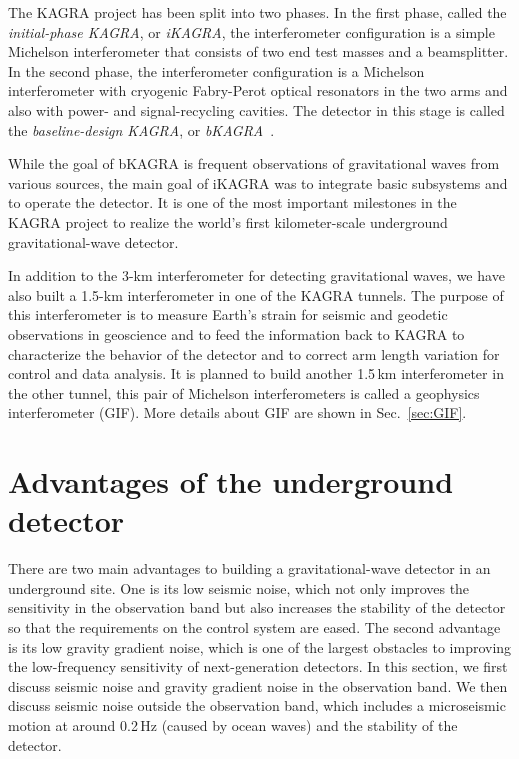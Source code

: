 \documentclass[prd ,twocolumn ,secnumarabic,dvips
,amssymb, amsmath,nobibnotes, aps, prd,superscriptaddress]{revtex4-1}
\begin{document}
{The KAGRA project has been split into two phases. In the first phase, called the {\it initial-phase KAGRA}, or {\it iKAGRA}, the interferometer configuration is a simple Michelson interferometer that consists of two end test masses and a beamsplitter. In the second phase, the interferometer configuration is a Michelson interferometer with cryogenic Fabry-Perot optical resonators in the two arms and also with power- and signal-recycling cavities. The detector in this stage is called the {\it baseline-design KAGRA}, or {\it bKAGRA}~\cite{KAGRA}. 

While the goal of bKAGRA is frequent observations of gravitational waves from various sources, the main goal of iKAGRA was to integrate basic subsystems and to operate the detector. It is one of the most important milestones in the KAGRA project to realize the world's first kilometer-scale underground gravitational-wave detector.

In addition to the 3-km interferometer for detecting gravitational waves, we have also built a 1.5-km interferometer in one of the KAGRA tunnels. The purpose of this interferometer is to measure Earth's strain for seismic and geodetic observations in geoscience and to feed the information back to KAGRA to characterize the behavior of the detector and to correct arm length variation for control and data analysis. It is planned to build another 1.5\,km interferometer in the other tunnel, this pair of Michelson interferometers is called a geophysics interferometer (GIF). More details about GIF are shown in Sec.~\ref{sec:GIF}.

\section{Advantages of the underground detector}\label{sec:3}
There are two main advantages to building a gravitational-wave detector in an underground site. One is its low seismic noise, which not only improves the sensitivity in the observation band but also increases the stability of the detector so that the requirements on the control system are eased. The second advantage is its low gravity gradient noise, which is one of the largest obstacles to improving the low-frequency sensitivity of next-generation detectors. In this section, we first discuss seismic noise and gravity gradient noise in the observation band. We then discuss seismic noise outside the observation band, which includes a microseismic motion at around 0.2\,Hz (caused by ocean waves) and the stability of the detector.

}
\end{document}
